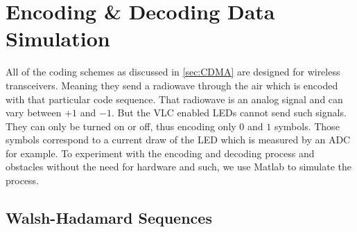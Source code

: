 
\section{Encoding \& Decoding Data Simulation}
\label{sec:enc-dec-theory}

	All of the coding schemes as discussed in \autoref{sec:CDMA} are designed for wireless transceivers.
	Meaning they send a radiowave through the air which is encoded with that particular code sequence.
	That radiowave is an analog signal and can vary between $+1$ and $-1$.
	But the VLC enabled LEDs cannot send such signals.
	They can only be turned on or off, thus encoding only $0$ and $1$ symbols.
	Those symbols correspond to a current draw of the LED which is measured by an ADC for example.
	To experiment with the encoding and decoding process and obstacles without the need for hardware and such, we use Matlab to simulate the process.

	\subsection{Walsh-Hadamard Sequences}

